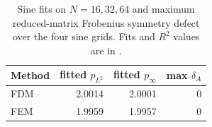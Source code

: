 \begin{table}[htbp]
\centering
\small
\setlength{\tabcolsep}{4pt}
\begin{tabular}{lrrr}
\toprule
Method & fitted $p_{L^2}$ & fitted $p_\infty$ & max $\delta_A$ \\
\midrule
FDM & 2.0014 & 2.0001 & $0$ \\
FEM & 1.9959 & 1.9957 & $0$ \\
\bottomrule
\end{tabular}
\caption{Sine fits on $N=16,32,64$ and maximum reduced-matrix Frobenius symmetry defect over the four sine grids. Fits and $R^2$ values are in .}
\label{tab:variable-sine-fits}
\end{table}
